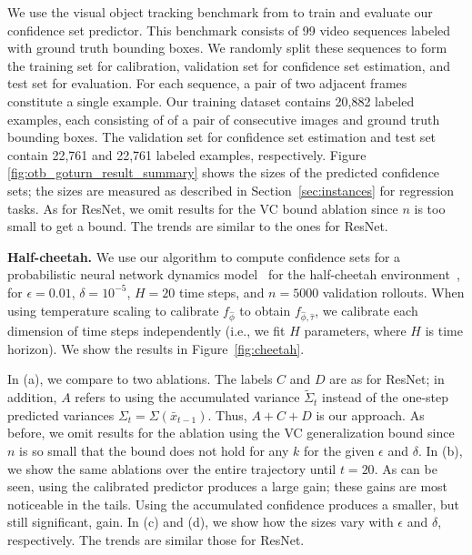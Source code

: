\documentclass{article} \usepackage{iclr2020_conference,times}
\renewcommand{\(}						{\left(}
\renewcommand{\)}						{\right)}
\renewcommand{\[}						{\left[}
\renewcommand{\]}						{\right]}
\newcommand{\<}						{\left<}
\renewcommand{\>}						{\right>}
\begin{document}
We use the visual object tracking benchmark from \cite{WuLimYang13} to train and evaluate our confidence set predictor. This benchmark consists of 99 video sequences labeled with ground truth bounding boxes. We randomly split these sequences to form the training set for calibration, validation set for confidence set estimation, and test set for evaluation. For each sequence, a pair of two adjacent frames constitute a single example. Our training dataset contains 20,882 labeled examples, each consisting of of a pair of consecutive images and ground truth bounding boxes. The validation set for confidence set estimation and test set contain 22,761 and 22,761 labeled examples, respectively.
Figure \ref{fig:otb_goturn_result_summary} shows the sizes of the predicted confidence sets; the sizes are measured as described in Section~\ref{sec:instances} for regression tasks. As for ResNet, we omit results for the VC bound ablation since $n$ is too small to get a bound. The trends are similar to the ones for ResNet.



\textbf{Half-cheetah.}
We use our algorithm to compute confidence sets for a probabilistic neural network dynamics model~\citep{chua2018deep} for the half-cheetah environment~\citep{brockman2016openai}, for $\epsilon=0.01$, $\delta=10^{-5}$, $H=20$ time steps, and $n=5000$ validation rollouts. When using temperature scaling to calibrate $f_{\hat{\phi}}$ to obtain $f_{\hat{\phi},\hat{\tau}}$, we calibrate each dimension of time steps independently (i.e., we fit $H$ parameters, where $H$ is time horizon). We show the results in Figure~\ref{fig:cheetah}.

In (a), we compare to two ablations. The labels $C$ and $D$ are as for ResNet; in addition, $A$ refers to using the accumulated variance $\tilde{\Sigma}_t$ instead of the one-step predicted variances $\Sigma_t=\Sigma(\bar{x}_{t-1})$. Thus, $A+C+D$ is our approach. As before, we omit results for the ablation using the VC generalization bound since $n$ is so small that the bound does not hold for any $k$ for the given $\epsilon$ and $\delta$. In (b), we show the same ablations over the entire trajectory until $t=20$. As can be seen, using the calibrated predictor produces a large gain;
these gains are most noticeable in the tails. Using the accumulated confidence produces a smaller, but still significant, gain. In (c) and (d), we show how the sizes vary with $\epsilon$ and $\delta$, respectively. The trends are similar those for ResNet.
\end{document}
